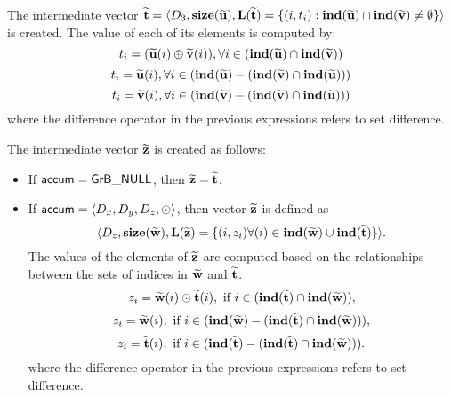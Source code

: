 The intermediate vector ${\bf \widetilde{t}} = \langle
D_3, \bold{size}({\bf \widetilde{u}}),
\bold{L}({\bf \widetilde{t}}) =
\{(i,t_i) : \bold{ind}({\bf \widetilde{u}}) \cap 
\bold{ind}({\bf \widetilde{v}})
 \neq \emptyset \} \rangle$
is created.  The value of each of its elements is computed by:
\[t_i = ({\bf \widetilde{u}}(i) \oplus {\bf \widetilde{v}}(i)), \forall i \in (\bold{ind}({\bf \widetilde{u}}) \cap \bold{ind}({\bf \widetilde{v}}))\]
\[t_i = {\bf \widetilde{u}}(i), \forall i \in (\bold{ind}({\bf \widetilde{u}}) - (\bold{ind}({\bf \widetilde{v}}) \cap \bold{ind}({\bf \widetilde{u}})))\]
\[t_i = {\bf \widetilde{v}}(i), \forall i \in (\bold{ind}({\bf \widetilde{v}}) - (\bold{ind}({\bf \widetilde{v}}) \cap \bold{ind}({\bf \widetilde{u}})))\]
where the difference operator in the previous expressions refers to set difference.

The intermediate vector ${\bf \widetilde{z}}$ is created as follows:
\begin{itemize}
    \item If ${\sf accum} = {\sf GrB\_NULL}$, then ${\bf \widetilde{z}} = {\bf \widetilde{t}}$.

    \item If ${\sf accum} = \langle D_x, D_y, D_z, \odot \rangle$, then vector ${\bf \widetilde{z}}$ is defined as 
        \[ \langle D_z, \bold{size}({\bf \widetilde{w}}), \bold{L}({\bf \widetilde{z}})
		= \{(i,z_{i})  \forall (i) \in \bold{ind}({\bf \widetilde{w}}) \cup 
        \bold{ind}({\bf \widetilde{t}}) \} \rangle.\]
    The values of the elements of ${\bf \widetilde{z}}$ are computed based on the 
    relationships between the sets of indices in ${\bf \widetilde{w}}$ and 
    ${\bf \widetilde{t}}$.
\[
z_{i} = {\bf \widetilde{w}}(i) \odot {\bf \widetilde{t}}(i), \ \mbox{if}\  i \in  (\bold{ind}({\bf \widetilde{t}}) \cap \bold{ind}({\bf \widetilde{w}})),
\]
\[
z_{i} = \vector{\widetilde{w}}(i), \ \mbox{if}\  i \in  (\bold{ind}(\vector{\widetilde{w}}) - (\bold{ind}(\vector{\widetilde{t}}) \cap \bold{ind}(\vector{\widetilde{w}}))),
\]
\[
z_{i} = \vector{\widetilde{t}}(i), \ \mbox{if}\  i \in  (\bold{ind}(\vector{\widetilde{t}}) - (\bold{ind}(\vector{\widetilde{t}}) \cap \bold{ind}(\vector{\widetilde{w}}))).
\]
where the difference operator in the previous expressions refers to set difference.
\end{itemize}

